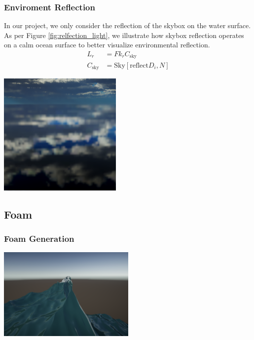 \subsubsection{Enviroment Reflection}
In our project, we only consider the reflection of the skybox on the water surface. As per Figure \ref{fig:relfection_light}, we illustrate how skybox reflection operates on a calm ocean surface to better visualize environmental reflection.
\begin{equation}
    \begin{split}
        L_r &= F k_r C_{\text{sky}}\\
        C_{\text{sky}} &= \text{Sky}[\text{reflect}{D_i, N}]
    \end{split}
\end{equation}
\begin{minipage}{1\textwidth}
    \centering
    \includegraphics[width=0.45\textwidth]{"images/reflection_light.png"}
    \label{fig:relfection_light}
\end{minipage}

\subsection{Foam}
\subsubsection{Foam Generation}
\begin{minipage}{1\textwidth}
    \centering
    \includegraphics[width=0.50\textwidth]{"images/wave_curl.png"}
    \label{fig:wave_curl}
\end{minipage}

